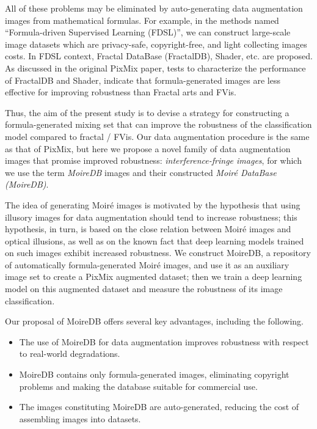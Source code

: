 All of these problems may be eliminated by auto-generating data augmentation images from mathematical formulas.
For example, in the methods named ``Formula-driven Supervised Learning (FDSL)'', we can construct large-scale image datasets which are privacy-safe, copyright-free, and light collecting images costs. 
In FDSL context, Fractal DataBase (FractalDB), Shader, etc. are proposed.
As discussed in the original PixMix paper,
tests to characterize the performance of
FractalDB and Shader, indicate that formula-generated images are less effective
for improving robustness than Fractal arts and FVis.

Thus, the aim of the present study is to devise a strategy for
constructing a formula-generated mixing set that can improve the robustness of the classification model compared to fractal / FVis.
Our data augmentation procedure is the same as that of PixMix,
but here we propose a novel family of data augmentation
images that promise improved robustness:
\textit{interference-fringe images}, for which 
we use the term \textit{MoireDB} images and their constructed \textit{Moir\'e DataBase (MoireDB)}.

The idea of generating Moir\'e images
is motivated by the hypothesis that using
illusory images for data augmentation should
tend to increase robustness; this hypothesis, in
turn, is based on the close relation between Moir\'e images
and optical illusions, as well as on the known fact that
deep learning models trained on such images exhibit
increased robustness.
We construct MoireDB, a repository
of automatically formula-generated Moir\'e images, and
use it as an auxiliary image set to create a PixMix augmented
dataset; then we train a deep learning model on this
augmented dataset and measure the robustness of its image classification.

Our proposal of MoireDB offers several key advantages, including the following.
\begin{itemize}
      \item The use of MoireDB for data augmentation
            improves robustness with respect to real-world degradations.
      \item MoireDB contains only formula-generated images,
            eliminating copyright problems and making the database
            suitable for commercial use.
      \item The images constituting MoireDB are auto-generated, reducing
            the cost of assembling images into datasets.
\end{itemize}